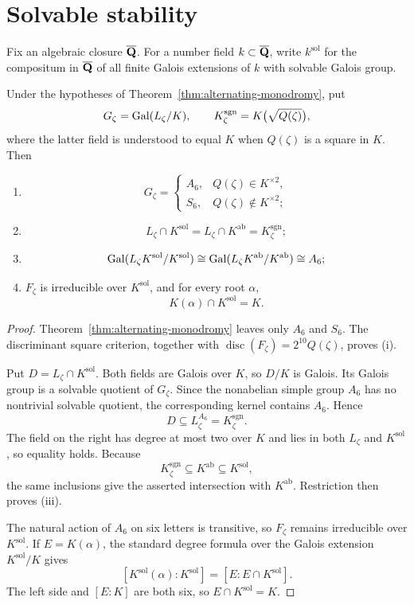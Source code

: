 \section{Solvable stability}
\label{sec:solvable-stability}

Fix an algebraic closure $\overline{\mathbf Q}$.  For a number field
$k\subset\overline{\mathbf Q}$, write $k^{\mathrm{sol}}$ for the compositum in
$\overline{\mathbf Q}$ of all finite Galois extensions of $k$ with solvable
Galois group.

\begin{corollary}
\label{cor:solvable-stability}
Under the hypotheses of Theorem~\ref{thm:alternating-monodromy}, put
\[
 G_\zeta=\operatorname{Gal}(L_\zeta/K),
 \qquad K_\zeta^{\mathrm{sgn}}=K\bigl(\sqrt{Q(\zeta)}\bigr),
\]
where the latter field is understood to equal $K$ when $Q(\zeta)$ is
a square in $K$.  Then
\begin{enumerate}[label=\textup{(\roman*)}]
 \item
 \[
 G_\zeta=
 \begin{cases}
  A_6,&Q(\zeta)\in K^{\times2},\\
  S_6,&Q(\zeta)\notin K^{\times2};
 \end{cases}
 \]
 \item
 \[
 L_\zeta\cap K^{\mathrm{sol}}
 =L_\zeta\cap K^{\mathrm{ab}}
 =K_\zeta^{\mathrm{sgn}};
 \]
 \item
 \[
 \operatorname{Gal}(L_\zeta K^{\mathrm{sol}}/K^{\mathrm{sol}})
 \cong
 \operatorname{Gal}(L_\zeta K^{\mathrm{ab}}/K^{\mathrm{ab}})
 \cong A_6;
 \]
 \item $F_\zeta$ is irreducible over $K^{\mathrm{sol}}$, and for
 every root $\alpha$,
 \[
 K(\alpha)\cap K^{\mathrm{sol}}=K.
 \]
\end{enumerate}
\end{corollary}

\begin{proof}
Theorem~\ref{thm:alternating-monodromy} leaves only $A_6$ and $S_6$.
The discriminant square criterion, together with
$\operatorname{disc}(F_\zeta)=2^{10}Q(\zeta)$, proves \textup{(i)}.

Put $D=L_\zeta\cap K^{\mathrm{sol}}$.  Both fields are Galois over
$K$, so $D/K$ is Galois.  Its Galois group is a solvable quotient of
$G_\zeta$.  Since the nonabelian simple group $A_6$ has no nontrivial
solvable quotient, the corresponding kernel contains $A_6$.  Hence
\[
 D\subseteq L_\zeta^{A_6}=K_\zeta^{\mathrm{sgn}}.
\]
The field on the right has degree at most two over $K$ and lies in both
$L_\zeta$ and $K^{\mathrm{sol}}$, so equality holds.  Because
\[
 K_\zeta^{\mathrm{sgn}}\subseteq K^{\mathrm{ab}}
 \subseteq K^{\mathrm{sol}},
\]
the same inclusions give the asserted intersection with
$K^{\mathrm{ab}}$.  Restriction then proves \textup{(iii)}.

The natural action of $A_6$ on six letters is transitive, so
$F_\zeta$ remains irreducible over $K^{\mathrm{sol}}$.  If
$E=K(\alpha)$, the standard degree formula over the Galois extension
$K^{\mathrm{sol}}/K$ gives
\[
 [K^{\mathrm{sol}}(\alpha):K^{\mathrm{sol}}]
 =[E:E\cap K^{\mathrm{sol}}].
\]
The left side and $[E:K]$ are both six, so
$E\cap K^{\mathrm{sol}}=K$.
\end{proof}

